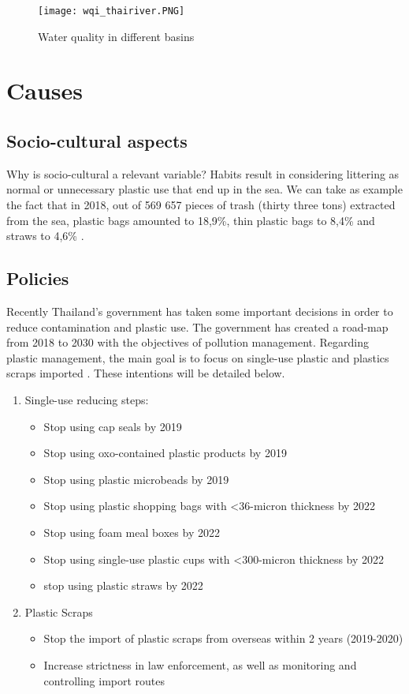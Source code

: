 \documentclass[twoside,a4paper,12pt]{report}
\begin{document}
\begin{figure}
    \centering
    \texttt{[image: wqi\_thairiver.PNG]}
    \caption{Water quality in different basins \cite{Wa_qua_thai}}
     \label{WQI_basins_thai} 
\end{figure}


\section{Causes}
\subsection{Socio-cultural aspects}
Why is socio-cultural a relevant variable? Habits result in considering littering as normal or unnecessary plastic use that end up in the sea. We can take as example the fact that in 2018, out of 569 657 pieces of trash (thirty three tons) extracted from the sea, plastic bags amounted to 18,9\%, thin plastic bags to 8,4\% and straws to 4,6\% \cite{PCD_poll2018}.

\subsection{Policies}
Recently Thailand's government has taken some important decisions in order to reduce contamination and plastic use. 
The government has created a road-map from 2018 to 2030 with the objectives of pollution management. Regarding plastic management, the main goal is to focus on single-use plastic and plastics scraps imported \cite{PCD_poll2018}. These intentions will be detailed below.

\begin{enumerate}
    \item Single-use reducing steps:
    \begin{itemize}
        \item Stop using cap seals by 2019
        \item Stop using oxo-contained plastic products by 2019
        \item Stop using plastic microbeads  by 2019
        \item Stop using plastic shopping bags with <36-micron thickness by 2022
        \item Stop using foam meal boxes by 2022
        \item Stop using single-use plastic cups with <300-micron thickness by 2022
        \item stop using plastic straws by 2022
    \end{itemize}
    \item Plastic Scraps
    \begin{itemize}
        \item Stop the import of plastic scraps from overseas within 2 years (2019-2020)
        \item Increase strictness in law enforcement, as well as monitoring and controlling import routes
    \end{itemize}
\end{enumerate}
\end{document}
